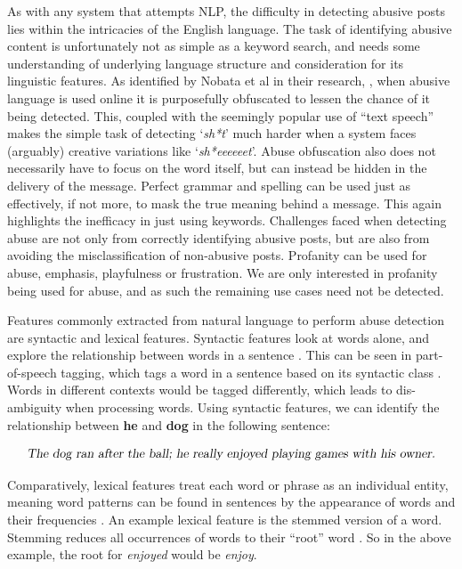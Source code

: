 As with any system that attempts NLP, the difficulty in detecting abusive posts lies within the intricacies of the English language. The task of identifying abusive content is unfortunately not as simple as a keyword search, and needs some understanding of underlying language structure and consideration for its linguistic features. As identified by Nobata et al in their research, \cite{nobata2016abusive}, when abusive language is used online it is purposefully obfuscated to lessen the chance of it being detected. This, coupled with the seemingly popular use of ``text speech'' makes the simple task of detecting `\emph{sh*t}' much harder when a system faces (arguably) creative variations like `\emph{sh*eeeeeet}'. Abuse obfuscation also does not necessarily have to focus on the word itself, but can instead be hidden in the delivery of the message. Perfect grammar and spelling can be used just as effectively, if not more, to mask the true meaning behind a message. This again highlights the inefficacy in just using keywords. Challenges faced when detecting abuse are not only from correctly identifying abusive posts, but are also from avoiding the misclassification of non-abusive posts. Profanity can be used for abuse, emphasis, playfulness or frustration. We are only interested in profanity being used for abuse, and as such the remaining use cases need not be detected. 

Features commonly extracted from natural language to perform abuse detection are syntactic and lexical features. Syntactic features look at words alone, and explore the relationship between words in a sentence \cite{liao2010large}. This can be seen in part-of-speech tagging, which tags a word in a sentence based on its syntactic class . Words in different contexts would be tagged differently, which leads to dis-ambiguity when processing words. Using syntactic features, we can identify the relationship between \textbf{he} and \textbf{dog} in the following sentence:

\begin{equation}
\label{eq:semantic}
\mbox{\textsl{The dog ran after the ball; he really enjoyed playing games with his owner.}}
\end{equation}

Comparatively, lexical features treat each word or phrase as an individual entity, meaning word patterns can be found in sentences by the appearance of words and their frequencies \cite{chen2012detecting}. An example lexical feature is the stemmed version of a word. Stemming reduces all occurrences of words to their ``root'' word \cite{Elastic:Stem}. So in the above example, the root for \emph{enjoyed} would be \emph{enjoy}. 

